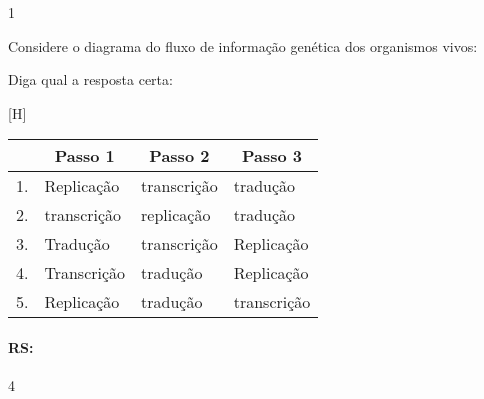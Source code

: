 \documentclass[\mainfilename]{subfiles}
\begin{document}
\begin{questionBox}1{}
    
    Considere o diagrama do fluxo de informação genética dos organismos vivos:
    \begin{center}
    \end{center}

    Diga qual a resposta certa:
    \begin{center}[H]\centering
        \begin{tabular}{c *{3}{l}}
            
            \toprule
            
                & \multicolumn{1}{c}{Passo 1}
                & \multicolumn{1}{c}{Passo 2}
                & \multicolumn{1}{c}{Passo 3}
            
            \\\midrule
            
            1. & Replicação  & transcrição & tradução
         \\ 2. & transcrição & replicação  & tradução
         \\ 3. & Tradução    & transcrição & Replicação
         \\ 4. & Transcrição & tradução    & Replicação
         \\ 5. & Replicação  & tradução    & transcrição
            
            \\\bottomrule
            
        \end{tabular}
    \end{center}

    \paragraph{RS:} 4
    
\end{questionBox}
\end{document}
